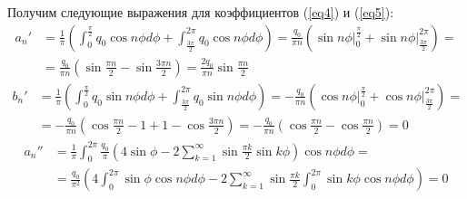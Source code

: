 Получим следующие выражения для коэффициентов (\ref{eq4}) и (\ref{eq5}):
\begin{equation}
    \label{eq12.1}
    \begin{split}
        a_n' & = \frac{1}{\pi} \left( \int_{0}^{\frac{\pi}{2}} q_0 \cos n\phi d\phi + \int_{\frac{3\pi}{2}}^{2\pi} q_0\cos n\phi d\phi \right) = \frac{q_0}{\pi n} \left( \sin n \phi \big|_{0}^{\frac{\pi}{2}} + \sin n \phi \big|_{\frac{3\pi}{2}}^{2\pi} \right) = 
        \\
        & = \frac{q_0}{\pi n} \left( \sin \frac{\pi n}{2} - \sin \frac{3\pi n}{2} \right) = \frac{2q_0}{\pi n} \sin \frac{\pi n}{2}
    \end{split}
\end{equation}
\begin{equation}
    \label{eq12.2}
    \begin{split}
        b_n' & = \frac{1}{\pi} \left( \int_{0}^{\frac{\pi}{2}} q_0 \sin n\phi d\phi + \int_{\frac{3\pi}{2}}^{2\pi} q_0 \sin n\phi d\phi \right) = -\frac{q_0}{\pi n} \left( \cos n\phi \big|_{0}^{\frac{\pi}{2}} + \cos n\phi \big|_{\frac{3\pi}{2}}^{2\pi} \right) =
        \\
        & = -\frac{q_0}{\pi n} \left( \cos \frac{\pi n}{2} - 1 + 1 - \cos \frac{3\pi n}{2} \right) = -\frac{q_0}{\pi n} \left( \cos \frac{\pi n}{2} - \cos \frac{\pi n}{2} \right) = 0
    \end{split}
\end{equation}
\begin{equation}
    \label{eq12.3}
    \begin{split}
        a_n'' & = \frac{1}{\pi} \int_{0}^{2\pi} \frac{q_0}{\pi} \left( 4\sin \phi - 2 \sum_{k=1}^{\infty} \sin \frac{\pi k}{2} \sin k\phi \right) \cos n\phi d\phi =
        \\
        & = \frac{q_0}{\pi^2} \left( 4\int_{0}^{2\pi} \sin\phi \cos n\phi d\phi - 2\sum_{k=1}^{\infty} \sin \frac{\pi k}{2} \int_{0}^{2\pi} \sin k\phi \cos n\phi d\phi \right) = 0
    \end{split}
\end{equation}
